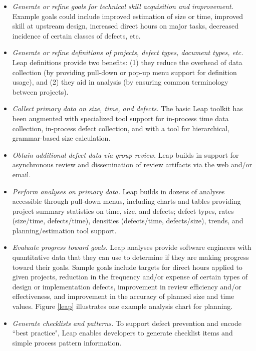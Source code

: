 \begin{itemize}
  
\item {\em Generate or refine goals for technical skill acquisition and
    improvement.} Example goals could include improved estimation of size
  or time, improved skill at upstream design, increased direct hours on
  major tasks, decreased incidence of certain classes of defects, etc.

\item {\em Generate or refine definitions of projects, defect types,
    document types, etc.} Leap definitions provide two benefits: (1) they
  reduce the overhead of data collection (by providing pull-down or pop-up
  menu support for definition usage), and (2) they aid in analysis (by
  ensuring common terminology between projects).
  
\item {\em Collect primary data on size, time, and defects.} The basic Leap
  toolkit has been augmented with specialized tool support for in-process
  time data collection, in-process defect collection, and with a tool for
  hierarchical, grammar-based size calculation.
  
\item {\em Obtain additional defect data via group review.} Leap builds in
  support for asynchronous review and dissemination of review artifacts via
  the web and/or email.
  
\item {\em Perform analyses on primary data.} Leap builds in dozens of
  analyses accessible through pull-down menus, including charts and tables
  providing project summary statistics on time, size, and defects; defect
  types, rates (size/time, defects/time), densities (defects/time,
  defects/size), trends, and planning/estimation tool support.
  
\item {\em Evaluate progress toward goals.} Leap analyses provide software
  engineers with quantitative data that they can use to determine if they
  are making progress toward their goals. Sample goals include
  targets for direct hours applied to given projects, reduction in the
  frequency and/or expense of certain types of design or implementation
  defects, improvement in review efficiency and/or effectiveness, and
  improvement in the accuracy of planned size and time values.  Figure
  \ref{leap} illustrates one example analysis chart for planning.
  
\item {\em Generate checklists and patterns. } To support defect prevention
  and encode ``best practice", Leap enables developers to generate checklist
  items and simple process pattern information.

\end{itemize}


